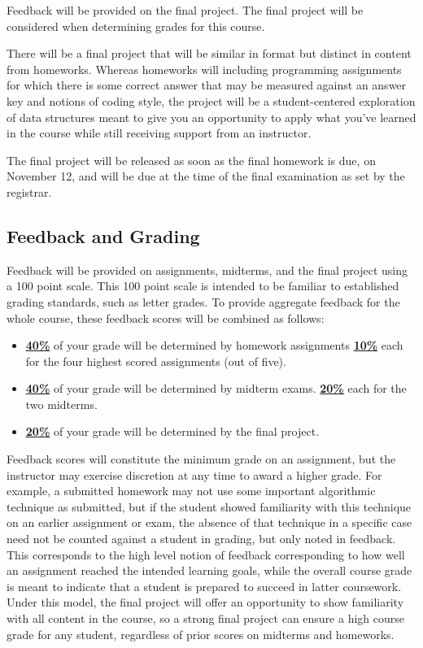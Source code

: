 \documentclass[11pt]{article}
\begin{document}
Feedback will be provided on the final project. The final project will be considered when determining grades for this course.


There will be a final project that will be similar in format but distinct in content from
homeworks. Whereas homeworks will including programming assignments for which there is
some correct answer that may be measured against an answer key and notions of coding
style, the project will be a student-centered exploration of data structures meant to
give you an opportunity to apply what you've learned in the course while still receiving
support from an instructor.

\bigskip
\noindent The final project will be released as soon as the final homework is due,
on November 12, and will be due at the time of the final examination as set 
by the registrar.

\subsection*{Feedback and Grading}
Feedback will be provided on assignments, midterms, and the final project using a 100 point scale.
This 100 point scale is intended to be familiar to established grading standards, such as letter grades. To provide aggregate feedback for the whole course, these feedback scores will be combined as follows:
\begin{itemize}
	\item \underline{\textbf{40\%}} of your grade will be determined by homework assignments
	\subitem \underline{\textbf{10\%}} each for the four highest scored assignments (out of five).
	\item \underline{\textbf{40\%}} of your grade will be determined by midterm exams.
	\subitem \underline{\textbf{20\%}} each for the two midterms.
	\item \underline{\textbf{20\%}} of your grade will be determined by the final project.
\end{itemize}

\noindent Feedback scores will constitute the minimum grade on an assignment, but the instructor
may exercise discretion at any time to award a higher grade. For example, a submitted homework
may not use some important algorithmic technique as submitted, but if the student showed familiarity
with this technique on an earlier assignment or exam, the absence of that technique in a specific
case need not be counted against a student in grading, but only noted in feedback. This corresponds to the high level notion of feedback corresponding to how well an assignment reached the intended learning goals, while the overall course grade is meant to indicate that a student is prepared to succeed in latter coursework. Under this model, the final project will offer an opportunity to show familiarity with all content in the course, so a strong final project can ensure a high course grade
for any student, regardless of prior scores on midterms and homeworks.


\end{document}
